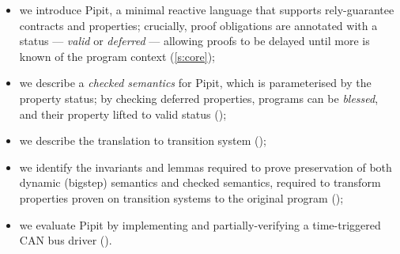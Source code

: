 \begin{itemize}
  \item we introduce Pipit, a minimal reactive language that supports rely-guarantee contracts and properties; crucially, proof obligations are annotated with a status --- \emph{valid} or \emph{deferred} --- allowing proofs to be delayed until more is known of the program context (\autoref{s:core});
  \item we describe a \emph{checked semantics} for Pipit, which is parameterised by the property status; by checking deferred properties, programs can be \emph{blessed}, and their property lifted to valid status ();
  \item we describe the translation to transition system ();
  \item we identify the invariants and lemmas required to prove preservation of both dynamic (bigstep) semantics and checked semantics, required to transform properties proven on transition systems to the original program ();
  \item we evaluate Pipit by implementing and partially-verifying a time-triggered CAN bus driver ().
\end{itemize}


